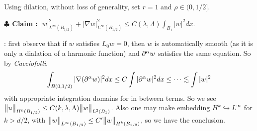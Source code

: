 \documentclass[12pt,a4paper]{article}
\newenvironment{proof}
{\begin{changemargin}{0.5cm}{0.5cm} 
	}%
	{\end{changemargin}
}
\newenvironment{subproof}
{\begin{changemargin}{0.5cm}{0.5cm} 
	}%
	{\end{changemargin}
}
\newenvironment{p}
{\begin{proof} 
	}%
	{\end{proof}
}
\begin{document}
\begin{p}
\pf Using dilation, without loss of generality, set $r=1$ and $\rho \in (0,1/2]$.

\textbf{$\clubsuit$ Claim :} $|w|^2_{L^{\infty}(B_{1/2})} + |\nabla w|^2_{L^{\infty}(B_{1/2})} \leq C(\lambda, \Lambda)\int_{B_1} |w|^2 dx$.
\begin{subproof}
: first observe that if $w$ satisfies $L_0 w =0$, then $w$ is automatically smooth (as it is only a dialation of a harmonic function) and $\partial^{\alpha} w$ satisfies the same equation. So by \emph{Cacciofolli},
\begin{align*}
\int_{B(0, 1/2)} |\nabla (\partial^{\alpha} w)|^2 dx \leq C \int |\partial^{\alpha} w|^2 dx \leq \cdots \lesssim \int |w|^2 
\end{align*}
with appropriate integration domains for in between terms. So we see $\bigl\lVert u\bigr\rVert_{H^k(B_{1/2})} \leq C(k, \lambda, \Lambda)\bigl\lVert w\bigr\rVert_{L^2(B_1)}$. Also one may make embedding $H^k \hookrightarrow L^{\infty}$ for $k>d/2$, with $\bigl\lVert w\bigr\rVert_{L^{\infty}(B_{1/2})} \leq C' \bigl\lVert w\bigr\rVert_{H^k(B_{1/2})}$, so we have the conclusion.


\end{subproof}
\end{p}
\end{document}
